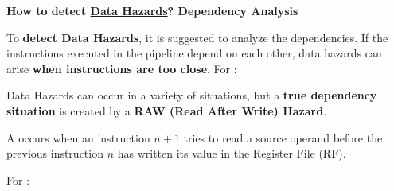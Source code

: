 \newpage

\begin{flushleft}
    \textcolor{Green3}{ \textbf{How to detect \underline{Data Hazards}? Dependency Analysis}}
\end{flushleft}
To \textbf{detect Data Hazards}, it is suggested to analyze the dependencies. If the instructions executed in the pipeline depend on each other, data hazards can arise \textbf{when instructions are too close}. For :

Data Hazards can occur in a variety of situations, but a \textbf{true dependency situation} is created by a \textbf{RAW (Read After Write) Hazard}.

\begin{definitionbox}
    A  occurs when an instruction $n+1$ tries to read a source operand before the previous instruction $n$ has written its value in the Register File (RF).
\end{definitionbox}

\noindent
For :


\newpage

